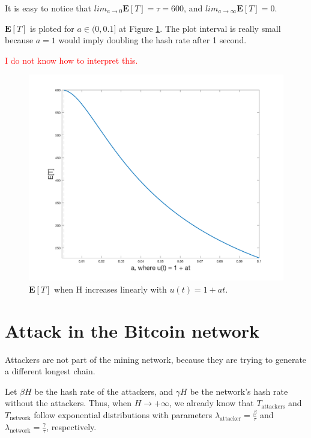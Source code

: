 It is easy to notice that $lim_{a \rightarrow 0} \mathbf{E}[T] = \tau = 600$, and $lim_{a \rightarrow \infty} \mathbf{E}[T] = 0$.

$\mathbf{E}[T]$ is ploted for $a \in (0, 0.1]$ at Figure \ref{fig-bitcoin-H-increase}. The plot interval is really small because $a=1$ would imply doubling the hash rate after 1 second.

\textcolor{red}{I do not know how to interpret this.}

\begin{figure}[ht]
\centering\includegraphics[width=\textwidth]{./images01/bitcoin-H-increasing.png}
\caption{$\mathbf{E}[T]$ when H increases linearly with $u(t) = 1 + at$.\label{fig-bitcoin-H-increase}}
\end{figure}


\section{Attack in the Bitcoin network}

Attackers are not part of the mining network, because they are trying to generate a different longest chain.

Let $\beta H$ be the hash rate of the attackers, and $\gamma H$ be the network's hash rate without the attackers. Thus, when $H \rightarrow +\infty$, we already know that $T_{\text{attackers}}$ and $T_{\text{network}}$ follow exponential distributions with parameters $\lambda_{\text{attacker}} = \frac{\beta}{\tau}$ and $\lambda_{\text{network}} = \frac{\gamma}{\tau}$, respectively.

